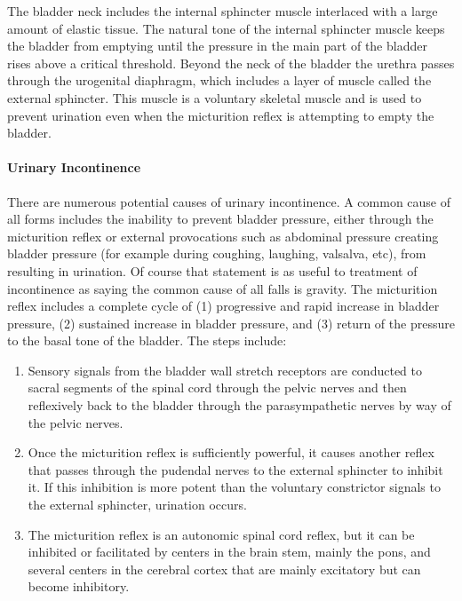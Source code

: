 The bladder neck includes the internal sphincter muscle interlaced with a large amount of elastic tissue. The natural tone of the internal sphincter muscle keeps the bladder from emptying until the pressure in the main part of the bladder rises above a critical threshold. Beyond the neck of the bladder the urethra passes through the urogenital diaphragm, which includes a layer of muscle called the external sphincter. This muscle is a voluntary skeletal muscle and is used to prevent urination even when the micturition reflex is attempting to empty the bladder.

\paragraph{Urinary Incontinence}

There are numerous potential causes of urinary incontinence. A common cause of all forms includes the inability to prevent bladder pressure, either through the micturition reflex or external provocations such as abdominal pressure creating bladder pressure (for example during coughing, laughing, valsalva, etc), from resulting in urination. Of course that statement is as useful to treatment of incontinence as saying the common cause of all falls is gravity. The micturition reflex includes a complete cycle of (1) progressive and rapid increase in bladder pressure, (2) sustained increase in bladder pressure, and (3) return of the pressure to the basal tone of the bladder. 
\vspace{4mm}
The steps include:

\begin{enumerate}
    \item Sensory signals from the bladder wall stretch receptors are conducted to sacral segments of the spinal cord through the pelvic nerves and then reflexively back to the bladder through the parasympathetic nerves by way of the pelvic nerves.
    \item  Once the micturition reflex is sufficiently powerful, it causes another reflex that passes through the pudendal nerves to the external sphincter to inhibit it. If this inhibition is more potent than the voluntary constrictor signals to the external sphincter, urination occurs.
    \item  The micturition reflex is an autonomic spinal cord reflex, but it can be inhibited or facilitated by centers in the brain stem, mainly the pons, and several centers in the cerebral cortex that are mainly excitatory but can become inhibitory.
\end{enumerate}

